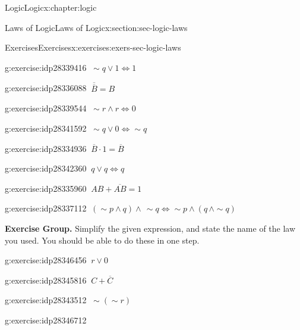 \documentclass[twoside,10pt,]{book}
\numberwithin{equation}{section}
\begin{document}
\begin{chapterptx}{Logic}{}{Logic}{}{}{x:chapter:logic}
\begin{sectionptx}{Laws of Logic}{}{Laws of Logic}{}{}{x:section:sec-logic-laws}
\begin{exercises-subsection}{Exercises}{}{Exercises}{}{}{x:exercises:exers-sec-logic-laws}
\begin{exercisegroup}
\begin{divisionexerciseeg}{5}{}{}{g:exercise:idp28339416}
\(\ \sim\!{q}{\vee} 1\Leftrightarrow 1\)\end{divisionexerciseeg}%
\begin{divisionexerciseeg}{6}{}{}{g:exercise:idp28336088}%
\(\ \overline{\overline{B}}=B\)\end{divisionexerciseeg}%
\begin{divisionexerciseeg}{7}{}{}{g:exercise:idp28339544}%
\(\ \sim\!{r}{\wedge} r\Leftrightarrow 0\)\end{divisionexerciseeg}%
\begin{divisionexerciseeg}{8}{}{}{g:exercise:idp28341592}%
\(\ \sim\!{q}{\vee} 0\Leftrightarrow\sim\!{q}\)\end{divisionexerciseeg}%
\begin{divisionexerciseeg}{9}{}{}{g:exercise:idp28334936}%
\(\ \overline{B}\cdot 1=\overline{B}\)\end{divisionexerciseeg}%
\begin{divisionexerciseeg}{10}{}{}{g:exercise:idp28342360}%
\(\ q{\vee} q\Leftrightarrow q\)\end{divisionexerciseeg}%
\begin{divisionexerciseeg}{11}{}{}{g:exercise:idp28335960}%
\(\ AB+\overline{AB}=1\)\end{divisionexerciseeg}%
\begin{divisionexerciseeg}{12}{}{}{g:exercise:idp28337112}%
\(\ (\sim\!{p}{\wedge} q){\wedge}\,\sim\!{q}\Leftrightarrow\sim\!{p}{\wedge}(q\,{\wedge}\sim\!{q})\)\end{divisionexerciseeg}%
\end{exercisegroup}
\par\medskip\noindent
\par\medskip\noindent%
\textbf{Exercise Group.}\space\space%
Simplify the given expression, and state the name of the law you used.  You should be able to do these in one step.\begin{exercisegroup}
\begin{divisionexerciseeg}{13}{}{}{g:exercise:idp28346456}%
\(\ r{\vee} 0\)\end{divisionexerciseeg}%
\begin{divisionexerciseeg}{14}{}{}{g:exercise:idp28345816}%
\(\ C+\overline{C}\)\end{divisionexerciseeg}%
\begin{divisionexerciseeg}{15}{}{}{g:exercise:idp28343512}%
\(\ \sim\!(\sim\!{r})\)\end{divisionexerciseeg}%
\begin{divisionexerciseeg}{16}{}{}{g:exercise:idp28346712}%

\end{divisionexerciseeg}
\end{exercisegroup}
\end{exercises-subsection}
\end{sectionptx}
\end{chapterptx}
\end{document}
